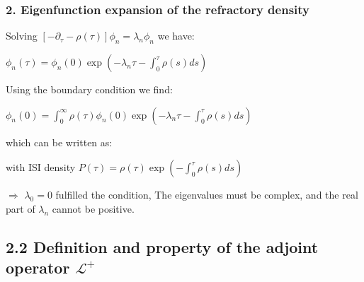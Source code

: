 \documentclass{beamer}
\begin{document}
\begin{frame}
\frametitle{2. Eigenfunction expansion of the refractory density}

Solving $[-\partial_{\tau}-\rho(\tau)]\phi_n=\lambda_n\phi_n$ we have:

\vspace{0.2cm}

\hspace{1.8cm}$\phi_n(\tau)=\phi_n(0)\exp(-\lambda_n\tau-\int_0^\tau\rho(s)ds)$

\vspace{0.5cm}
\pause
Using the boundary condition we find:

\vspace{0.2cm}

\hspace{1.8cm}$\phi_n(0)=\int_0^{\infty}\rho(\tau)\phi_n(0)\exp(-\lambda_n\tau-\int_0^\tau\rho(s)ds)$

\vspace{0.5cm}
\pause
which can be written as:

\vspace{0.2cm}

\hspace{2.5cm}

\vspace{0.5cm}
with ISI density $P(\tau)=\rho(\tau) \exp(-\int_0^\tau\rho(s)ds)$

\vspace{0.5cm}
\pause
$\Rightarrow$ $\lambda_0=0$ fulfilled the condition, The eigenvalues must be complex, and the real part of $\lambda_n$ cannot be positive.


\end{frame}

\subsection{2.2 Definition and property of the adjoint operator $\mathcal{L}^+$}
\end{document}
